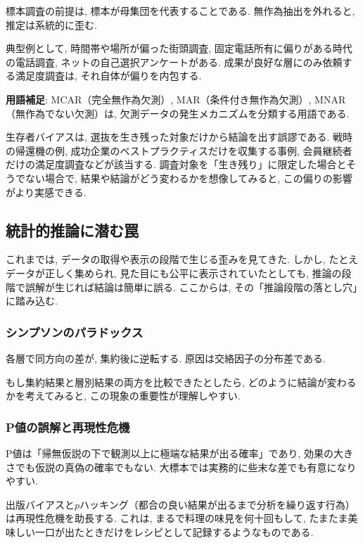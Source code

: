 標本調査の前提は, 標本が母集団を代表することである.  
無作為抽出を外れると, 推定は系統的に歪む.  

典型例として, 時間帯や場所が偏った街頭調査, 固定電話所有に偏りがある時代の電話調査, ネットの自己選択アンケートがある.  
成果が良好な層にのみ依頼する満足度調査は, それ自体が偏りを内包する.  

\textbf{用語補足}: MCAR（完全無作為欠測）, MAR（条件付き無作為欠測）, MNAR（無作為でない欠測）は, 欠測データの発生メカニズムを分類する用語である.

生存者バイアスは, 選抜を生き残った対象だけから結論を出す誤謬である.  
戦時の帰還機の例, 成功企業のベストプラクティスだけを収集する事例, 会員継続者だけの満足度調査などが該当する.  
調査対象を「生き残り」に限定した場合とそうでない場合で, 結果や結論がどう変わるかを想像してみると, この偏りの影響がより実感できる.

\subsection{統計的推論に潜む罠}

これまでは, データの取得や表示の段階で生じる歪みを見てきた.  
しかし, たとえデータが正しく集められ, 見た目にも公平に表示されていたとしても, 推論の段階で誤解が生じれば結論は簡単に誤る.  
ここからは, その「推論段階の落とし穴」に踏み込む.

\subsubsection{シンプソンのパラドックス}

各層で同方向の差が, 集約後に逆転する.  
原因は交絡因子の分布差である.  

もし集約結果と層別結果の両方を比較できたとしたら, どのように結論が変わるかを考えてみると, この現象の重要性が理解しやすい.

\subsubsection{P値の誤解と再現性危機}

P値は「帰無仮説の下で観測以上に極端な結果が出る確率」であり, 効果の大きさでも仮説の真偽の確率でもない.  
大標本では実務的に些末な差でも有意になりやすい.  

出版バイアスと$p$ハッキング（都合の良い結果が出るまで分析を繰り返す行為）は再現性危機を助長する.  
これは, まるで料理の味見を何十回もして, たまたま美味しい一口が出たときだけをレシピとして記録するようなものである.  

